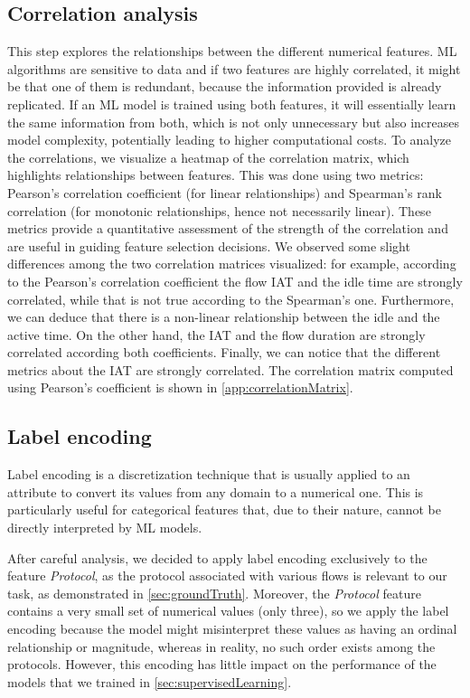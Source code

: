 \documentclass[acmlarge,nonacm]{acmart}
\begin{document}
\subsection{Correlation analysis} \label{sec:correlationAnalysis}
This step explores the relationships between the different numerical features. ML algorithms are sensitive to data and if two features are highly correlated, it might be that one of them is redundant, because the information provided is already replicated. If an ML model is trained using both features, it will essentially learn the same information from both, which is not only unnecessary but also increases model complexity, potentially leading to higher computational costs. To analyze the correlations, we visualize a heatmap of the correlation matrix, which highlights relationships between features. This was done using two metrics: Pearson's correlation coefficient (for linear relationships) and Spearman's rank correlation (for monotonic relationships, hence not necessarily linear). These metrics provide a quantitative assessment of the strength of the correlation and are useful in guiding feature selection decisions. We observed some slight differences among the two correlation matrices visualized: for example, according to the Pearson's correlation coefficient the flow IAT and the idle time are strongly correlated, while that is not true according to the Spearman's one. Furthermore, we can deduce that there is a non-linear relationship between the idle and the active time. On the other hand, the IAT and the flow duration are strongly correlated according both coefficients. Finally, we can notice that the different metrics about the IAT are strongly correlated. The correlation matrix computed using Pearson's coefficient is shown in \cref{app:correlationMatrix}.

\subsection{Label encoding} \label{sec:labelEncoding}
Label encoding is a discretization technique that is usually applied to an attribute to convert its values from any domain to a numerical one. This is particularly useful for categorical features that, due to their nature, cannot be directly interpreted by ML models.

After careful analysis, we decided to apply label encoding exclusively to the feature \emph{Protocol}, as the protocol associated with various flows is relevant to our task, as demonstrated in \cref{sec:groundTruth}. Moreover, the \emph{Protocol} feature contains a very small set of numerical values (only three), so we apply the label encoding because the model might misinterpret these values as having an ordinal relationship or magnitude, whereas in reality, no such order exists among the protocols. However, this encoding has little impact on the performance of the models that we trained in \cref{sec:supervisedLearning}. 
\end{document}
